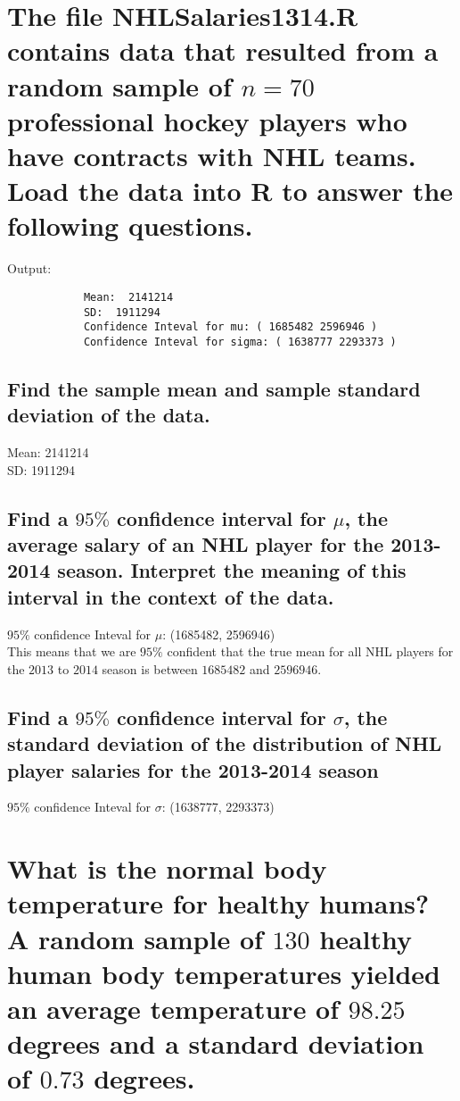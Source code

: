 \documentclass[10pt, letterpaper, titlepage]{article}
\begin{document}
    \section{The file {\color{red} NHLSalaries1314.R} contains data that resulted from a random sample of 
        $n = 70$ professional hockey players who have contracts with NHL teams. Load the data
        into R to answer the following questions.}

        

        \noindent
        Output:
        \begin{verbatim}
            Mean:  2141214 
            SD:  1911294 
            Confidence Inteval for mu: ( 1685482 2596946 )
            Confidence Inteval for sigma: ( 1638777 2293373 )
        \end{verbatim}

        \subsection{Find the sample mean and sample standard deviation of the data.}
            Mean:  2141214 \\
            SD:  1911294

        \subsection{Find a $95\%$ confidence interval for $\mu$, the average salary of an NHL player for the
            2013-2014 season. Interpret the meaning of this interval in the context of the data.}
            $95\%$ confidence Inteval for $\mu$: (1685482, 2596946)\\
            This means that we are $95\%$ confident that the true mean for all NHL players for the
            $2013$ to $2014$ season is between $1685482$ and $2596946$.

        \subsection{Find a $95\%$ confidence interval for $\sigma$, the standard deviation of the distribution of
            NHL player salaries for the 2013-2014 season}
            $95\%$ confidence Inteval for $\sigma$: (1638777, 2293373)

    \newpage
    \section{What is the normal body temperature for healthy humans? A random sample of $130$
        healthy human body temperatures yielded an average temperature of $98.25$ degrees
        and a standard deviation of $0.73$ degrees.}
\end{document}
